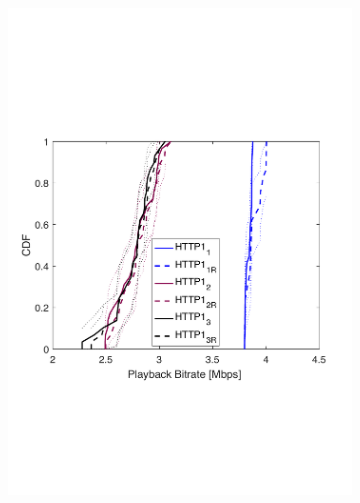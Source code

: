 \begin{figure}[t!]
\centering
\begin{subfigure}[t]{0.33\textwidth}
   \captionsetup{justification=centering,margin=4.5cm}
    \includegraphics[trim={0 7cm 0 7cm}, scale=0.25]{figures/CDF_bitrat_squad_parallel_http1_nd18.pdf}
     \caption{}
    \label{fig:phttp1bitrate}
  \end{subfigure}
  \begin{subfigure}[t]{0.33\textwidth}
  \captionsetup{justification=raggedright,singlelinecheck=false,margin=2.5cm}

\end{subfigure}
\end{figure}
